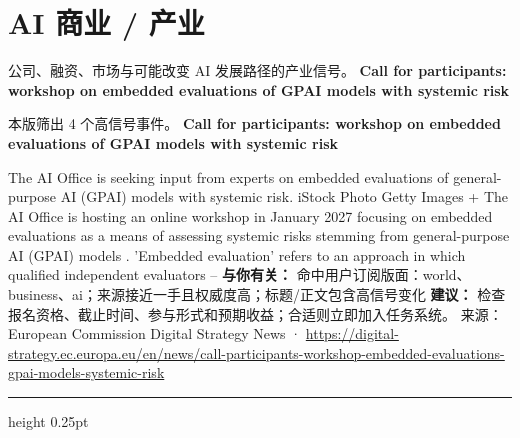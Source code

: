 \documentclass[10.5pt]{ctexart}
\begin{document}
\section*{AI 商业 / 产业}
{\color{ormuted} 公司、融资、市场与可能改变 AI 发展路径的产业信号。}
\vspace{2mm}
{\LARGE\bfseries Call for participants: workshop on embedded evaluations of GPAI models with systemic risk}\par
\vspace{1mm}
{\color{ormuted} 本版筛出 4 个高信号事件。}
\vspace{3mm}
{\Large\bfseries Call for participants: workshop on embedded evaluations of GPAI models with systemic risk}\par
The AI Office is seeking input from experts on embedded evaluations of general-purpose AI (GPAI) models with systemic risk. iStock Photo Getty Images + The AI Office is hosting an online workshop in January 2027 focusing on embedded evaluations as a means of assessing systemic risks stemming from general-purpose AI (GPAI) models . 'Embedded evaluation' refers to an approach in which qualified independent evaluators –
\textbf{与你有关：} 命中用户订阅版面：world、business、ai；来源接近一手且权威度高；标题/正文包含高信号变化
\textbf{建议：} 检查报名资格、截止时间、参与形式和预期收益；合适则立即加入任务系统。
{\footnotesize\color{ormuted} 来源：European Commission Digital Strategy News · \url{https://digital-strategy.ec.europa.eu/en/news/call-participants-workshop-embedded-evaluations-gpai-models-systemic-risk}}
\vspace{4mm}
\hrule height 0.25pt
\vspace{3mm}
\end{document}
